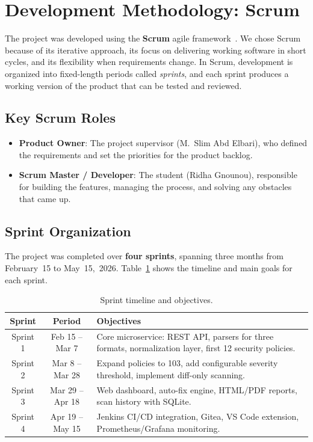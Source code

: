 \section{Development Methodology: Scrum}
\label{sec:scrum}

The project was developed using the \textbf{Scrum} agile framework~\cite{schwaber2020scrum}. We chose Scrum because of its iterative approach, its focus on delivering working software in short cycles, and its flexibility when requirements change. In Scrum, development is organized into fixed-length periods called \emph{sprints}, and each sprint produces a working version of the product that can be tested and reviewed.

\subsection{Key Scrum Roles}

\begin{itemize}[leftmargin=1.5cm]
  \item \textbf{Product Owner}: The project supervisor (M.~Slim Abd Elbari), who defined the requirements and set the priorities for the product backlog.
  \item \textbf{Scrum Master / Developer}: The student (Ridha Gnounou), responsible for building the features, managing the process, and solving any obstacles that came up.
\end{itemize}

\subsection{Sprint Organization}

The project was completed over \textbf{four sprints}, spanning three months from February~15 to May~15,~2026. Table~\ref{tab:sprints-overview} shows the timeline and main goals for each sprint.

\begin{table}[H]
\centering
\begin{tabularx}{\textwidth}{|c|c|X|}
\hline
\textbf{Sprint} & \textbf{Period} & \textbf{Objectives} \\
\hline
Sprint 1 & Feb 15 -- Mar 7 & Core microservice: REST API, parsers for three formats, normalization layer, first 12 security policies. \\
\hline
Sprint 2 & Mar 8 -- Mar 28 & Expand policies to 103, add configurable severity threshold, implement diff-only scanning. \\
\hline
Sprint 3 & Mar 29 -- Apr 18 & Web dashboard, auto-fix engine, HTML/PDF reports, scan history with SQLite. \\
\hline
Sprint 4 & Apr 19 -- May 15 & Jenkins CI/CD integration, Gitea, VS Code extension, Prometheus/Grafana monitoring. \\
\hline
\end{tabularx}
\caption{Sprint timeline and objectives.}
\label{tab:sprints-overview}
\end{table}

